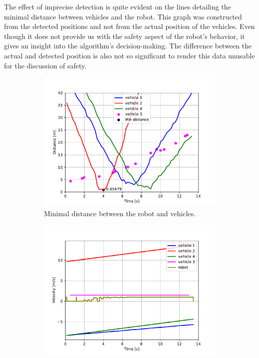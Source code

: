             The effect of imprecise detection is quite evident on the lines detailing the minimal distance between vehicles and the robot. This graph was constructed from the detected positions and not from the actual position of the vehicles. Even though it does not provide us with the safety aspect of the robot's behavior, it gives an insight into the algorithm's decision-making. The difference between the actual and detected position is also not so significant to render this data unusable for the discussion of safety.\\
            \begin{figure}[H]
                \centering
                \begin{subfigure}{0.49\linewidth}
                    \centering
                    \includegraphics[trim={24 8 40 37}, clip, width=\linewidth]{images/simulations/scene5_dist.pdf}
                    \caption{Minimal distance between the robot and vehicles.}
                \end{subfigure}
                \begin{subfigure}{0.49\linewidth}
                    \centering
                    \includegraphics[trim={21 8 40 37}, clip, width=\linewidth]{images/simulations/scene5_vel.pdf}

\end{subfigure}
\end{figure}
